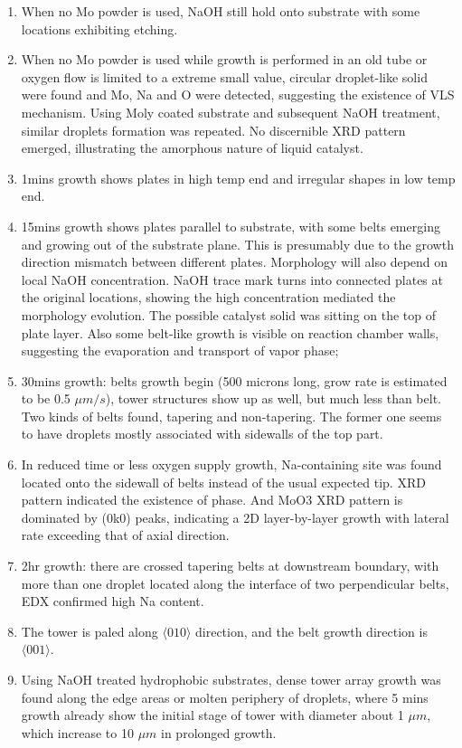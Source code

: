 \begin{enumerate}
\item When no Mo powder is used, NaOH still hold onto substrate with some locations exhibiting etching.
\item When no Mo powder is used while growth is performed in an old tube or oxygen flow is limited to a extreme small value, circular droplet-like solid were found and Mo, Na and O were detected, suggesting the existence of VLS mechanism. Using Moly coated substrate and subsequent NaOH treatment, similar droplets formation was repeated. No discernible XRD pattern emerged, illustrating the amorphous nature of liquid catalyst.
\item 1mins growth shows plates in high temp end and irregular shapes in low temp end.
\item 15mins growth shows  plates parallel to substrate, with some belts emerging and growing out of the substrate plane. This is presumably due to the growth direction mismatch between different plates. Morphology will also depend on local NaOH concentration. NaOH trace mark turns into connected plates at the original locations, showing the high concentration mediated the morphology evolution. The possible catalyst solid was sitting on the top of plate layer. Also some belt-like growth is visible on reaction chamber walls, suggesting the evaporation and transport of  vapor phase;
\item 30mins growth:  belts growth begin (500 microns long, grow rate is estimated to be 0.5 $\mu m/s$), tower structures show up as well, but much less than belt. Two kinds of belts found, tapering and non-tapering. The former one seems to have droplets mostly associated with sidewalls of the top part.
\item In reduced time or less oxygen supply growth, Na-containing site was found located onto the sidewall of belts instead of the usual expected tip. XRD pattern indicated the existence of  phase. And MoO3 XRD pattern is dominated by (0k0) peaks, indicating a 2D layer-by-layer growth with lateral rate exceeding that of axial direction.
\item 2hr growth: there are crossed tapering belts at downstream boundary, with more than one droplet located along the interface of two perpendicular belts, EDX confirmed high Na content.
\item The tower is paled along $\langle010\rangle$ direction, and the belt growth direction is $\langle001\rangle$.
\item Using NaOH treated hydrophobic substrates, dense tower array growth was found along the edge areas or molten periphery of droplets, where 5 mins growth already show the initial stage of tower with diameter about 1 $\mu m$, which increase to 10 $\mu m$ in prolonged growth.
\end{enumerate}

